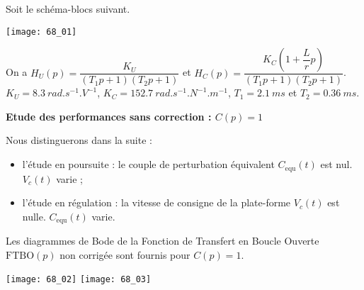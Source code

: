 \normaltrue \difficilefalse \tdifficilefalse
\correctionfalse

\setcounter{question}{0}


\ifcorrection
\else
{}
\fi

\ifprof
\else

Soit le schéma-blocs suivant. 

\begin{center}
\texttt{[image: 68\_01]}
\end{center}

On a $H_U(p) = \dfrac{K_U}{\left( T_1 p +1 \right)\left( T_2 p +1 \right)}$ et $H_C(p) = \dfrac{K_C \left( 1+\dfrac{L}{r}p\right)}{\left( T_1 p +1 \right)\left( T_2 p +1 \right)}$. $K_U =\SI{8,3}{rad.s^{-1}.V^{-1}}$, $K_C = \SI{152,7}{rad.s^{-1}.N^{-1}.m^{-1}}$, $T_1 = \SI{2,1}{ms}$ et $T_2 = \SI{0,36}{ms}$.

\textbf{Etude des performances sans correction : $C( p) =1$}

Nous distinguerons dans la suite :
\begin{itemize}
\item l’étude en poursuite : le couple de perturbation équivalent $C_{\text{equ}} (t)$ est nul. $V_c(t)$ varie ;
\item l’étude en régulation : la vitesse de consigne de la plate-forme $V_c(t)$  est nulle. $C_{\text{equ}} (t)$ varie.
\end{itemize}

Les diagrammes de Bode de la Fonction de Transfert en Boucle Ouverte $\text{FTBO}( p)$ non corrigée sont fournis pour $C( p) = 1$.

\begin{center}
\texttt{[image: 68\_02]}
\texttt{[image: 68\_03]}
\end{center}
\fi

\ifprof
\else 
\fi

\ifprof
\else 
\fi

